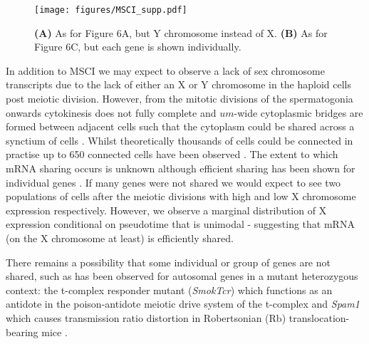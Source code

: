 \begin{figure}[H]
	\centering
	\texttt{[image: figures/MSCI\_supp.pdf]}
	\caption{
		\textbf{(A)} As for Figure 6A, but Y chromosome instead of X.
		\textbf{(B)} As for Figure 6C, but each gene is shown individually.}
	\label{fig:MSCI_supp}
\end{figure}


In addition to MSCI we may expect to observe a lack of sex chromosome transcripts due to the lack of either an X or Y chromosome in the haploid cells post meiotic division. However, from the mitotic divisions of the spermatogonia onwards cytokinesis does not fully complete and $um$-wide cytoplasmic bridges are formed between adjacent cells such that the cytoplasm could be shared across a synctium of cells \cite{Greenbaum2011Germ}. Whilst theoretically thousands of cells could be connected in practise up to 650 connected cells have been observed \cite{Ren1991Clonal}. The extent to which mRNA sharing occurs is unknown although efficient sharing has been shown for individual genes \cite{Braun1989Genetically}. If many genes were not shared we would expect to see two populations of cells after the meiotic divisions with high and low X chromosome expression respectively. However, we observe a marginal distribution of X expression conditional on pseudotime that is unimodal - suggesting that mRNA (on the X chromosome at least) is efficiently shared.

There remains a possibility that some individual or group of genes are not shared, such as has been observed for autosomal genes in a mutant heterozygous context: the t-complex responder mutant (\textit{SmokTcr}) which functions as an antidote in the poison-antidote meiotic drive system of the t-complex \cite{Veron2009Retention} and \textit{Spam1} which causes transmission ratio distortion in Robertsonian (Rb) translocation-bearing mice \cite{Martin-DeLeon2005Spam1associated}.

